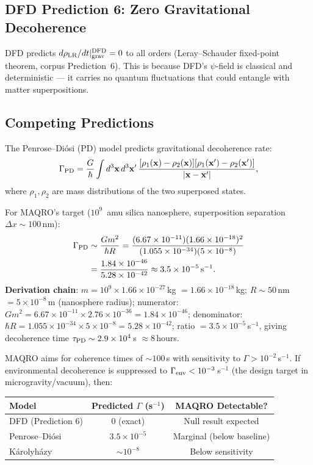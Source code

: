 \documentclass[11pt]{article}
\newcommand{\ee}[1]{\times 10^{#1}}
\begin{document}
\subsection{DFD Prediction 6: Zero Gravitational Decoherence}

DFD predicts $d\rho_{\rm LR}/dt|_{\rm grav}^{\rm DFD} = 0$ to all
orders (Leray--Schauder fixed-point theorem, corpus Prediction~6).
This is because DFD's $\psi$-field is classical and deterministic ---
it carries no quantum fluctuations that could entangle with matter
superpositions.

\subsection{Competing Predictions}

The Penrose--Di\'osi (PD) model predicts gravitational decoherence rate:
\begin{equation}
\Gamma_{\rm PD} = \frac{G}{\hbar}\int d^3\mathbf{x}\,d^3\mathbf{x}'\,
\frac{[\rho_1(\mathbf{x}) - \rho_2(\mathbf{x})]
[\rho_1(\mathbf{x}') - \rho_2(\mathbf{x}')]}{|\mathbf{x} - \mathbf{x}'|},
\end{equation}
where $\rho_1, \rho_2$ are mass distributions of the two superposed states.

For MAQRO's target ($10^9$~amu silica nanosphere, superposition
separation $\Delta x \sim 100\,$nm):
\begin{align}
\Gamma_{\rm PD} &\sim \frac{G m^2}{\hbar R}
= \frac{(6.67\ee{-11})(1.66\ee{-18})^2}{(1.055\ee{-34})(5\ee{-8})} \nonumber\\
&= \frac{1.84\ee{-46}}{5.28\ee{-42}}
\approx 3.5\ee{-5}\,\text{s}^{-1}.
\end{align}
\textbf{Derivation chain}: $m = 10^9 \times 1.66\ee{-27}\,$kg $=
1.66\ee{-18}\,$kg; $R \sim 50\,$nm $= 5\ee{-8}\,$m (nanosphere radius);
numerator: $G m^2 = 6.67\ee{-11} \times 2.76\ee{-36} = 1.84\ee{-46}$;
denominator: $\hbar R = 1.055\ee{-34} \times 5\ee{-8} = 5.28\ee{-42}$;
ratio $= 3.5\ee{-5}\,$s$^{-1}$, giving decoherence time $\tau_{\rm PD}
\sim 2.9\ee{4}\,$s $\approx 8\,$hours.

MAQRO aims for coherence times of $\sim 100\,$s with sensitivity to
$\Gamma > 10^{-2}\,$s$^{-1}$. If environmental decoherence is
suppressed to $\Gamma_{\rm env} < 10^{-3}\,$s$^{-1}$ (the design
target in microgravity/vacuum), then:

\begin{center}
\begin{tabular}{lcc}
\toprule
\textbf{Model} & \textbf{Predicted $\Gamma$ (s$^{-1}$)} &
\textbf{MAQRO Detectable?} \\
\midrule
DFD (Prediction 6) & 0 (exact) & Null result expected \\
Penrose--Di\'osi & $3.5\ee{-5}$ & Marginal (below baseline) \\
K\'arolyh\'azy & $\sim 10^{-8}$ & Below sensitivity \\
\bottomrule
\end{tabular}
\end{center}
\end{document}
